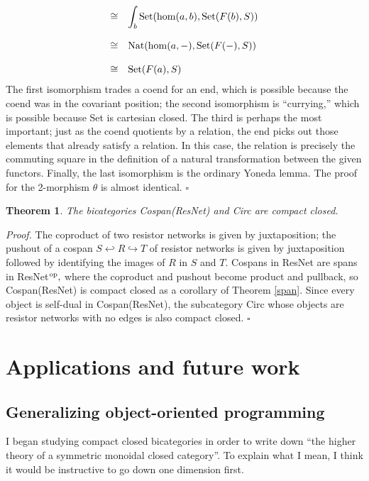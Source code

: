 \documentclass[12pt,twoside,openright]{report}
\newtheorem{thm}{Theorem}
\newcommand{\Set}{\mathrm{Set}}
\renewcommand{\hom}{{\rm hom}}
\newcommand{\op}{{\rm op}}
\begin{document}
\begin{itemize}
\[\begin{array}{rl}
     \cong & \displaystyle \int_b \Set(\hom(a, b), \Set(F(b), S)) \\ \\
     \cong & \displaystyle \mbox{Nat}(\hom(a, -), \Set(F(-), S)) \\ \\
     \cong & \displaystyle \Set(F(a), S) 
  \end{array} \]  
  The first isomorphism trades a coend for an end, which is possible because the coend was in the covariant position; the second isomorphism is ``currying,'' which is possible because Set is cartesian closed.  The third is perhaps the most important; just as the coend quotients by a relation, the end picks out those elements that already satisfy a relation.  In this case, the relation is precisely the commuting square in the definition of a natural transformation between the given functors.  Finally, the last isomorphism is the ordinary Yoneda lemma. The proof for the 2-morphism $\theta$ is almost identical.
\hfill $\square$
    
\end{itemize}

\begin{thm}
  The bicategories Cospan(ResNet) and Circ are compact closed.
\end{thm}
{\em Proof.} The coproduct of two resistor networks is given by juxtaposition; the pushout of a cospan $S \hookleftarrow R
\hookrightarrow T$ of resistor networks is given by juxtaposition followed by identifying the images of $R$ in $S$ and $T$.  Cospans in ResNet are spans in ResNet${}^{\op},$ where the coproduct and pushout become product and pullback, so Cospan(ResNet) is compact closed as a corollary of Theorem \ref{span}.  Since every object is self-dual in Cospan(ResNet), the subcategory Circ whose objects are resistor networks with no edges is also compact closed. \hfill $\square$

\section{Applications and future work}

\subsection{Generalizing object-oriented programming}
I began studying compact closed bicategories in order to write down ``the higher theory of a symmetric monoidal closed category''.  To explain what I mean, I think it would be instructive to go down one dimension first.
\end{document}
